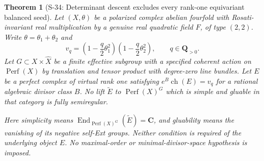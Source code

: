 \documentclass[11pt,a4paper]{article}
\newtheorem{theorem}{Theorem}[section]
\theoremstyle{definition}
\begin{document}
\begin{theorem}[S-34: Determinant descent excludes every rank-one equivariant balanced seed]
\label{thm:semireg-rm-rank-one-equivariant}
Let $(X,\theta)$ be a polarized complex abelian fourfold
with Rosati-invariant real multiplication by a genuine
real quadratic field $F$, of type $(2,2)$. Write
$\theta=\theta_1+\theta_2$ and
\[
 v_q=\left(1-\frac q2\theta_1^2\right)
       \left(1-\frac q2\theta_2^2\right),\qquad q\in\mathbf Q_{>0}.
 \tag{S34.1}
\]
Let $G\subset X\times\widehat X$ be a finite effective
subgroup with a specified coherent action on
$\operatorname{Perf}(X)$ by translation and tensor product
with degree-zero line bundles. Let $E$ be a perfect complex
of virtual rank one satisfying
$e^B\operatorname{ch}(E)=v_q$ for a rational algebraic
divisor class $B$. No lift $\widetilde E$ to
$\operatorname{Perf}(X)^G$ which is simple and gluable
in that category is fully semiregular.

Here simplicity means
$\operatorname{End}_{\operatorname{Perf}(X)^G}
(\widetilde E)=\mathbf C$, and gluability means the
vanishing of its negative self-Ext groups. Neither condition
is required of the underlying object $E$. No maximal-order
or minimal-divisor-space hypothesis is imposed.
\end{theorem}
\end{document}
